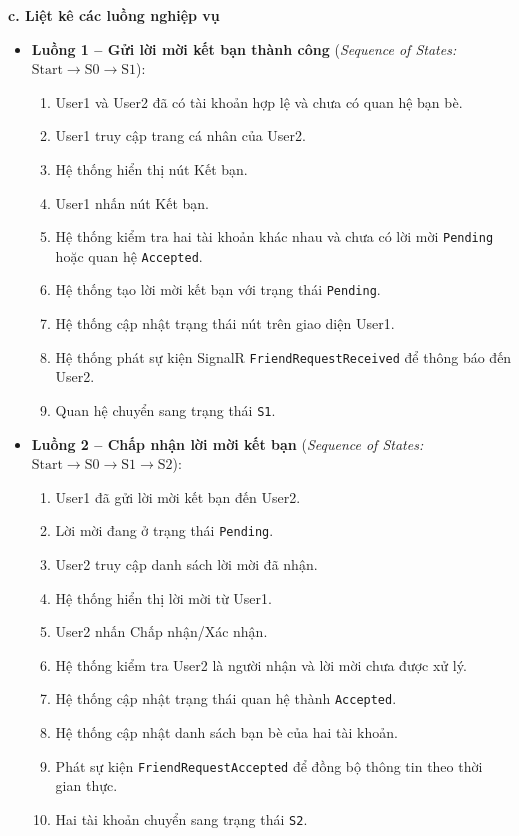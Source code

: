 \documentclass[11pt,a4paper]{article}
\begin{document}
\noindent\textbf{c. Liệt kê các luồng nghiệp vụ}
\begin{itemize}[leftmargin=1.2cm, noitemsep]
    \item[\textbf{--}] \textbf{Luồng 1 -- Gửi lời mời kết bạn thành công} (\textit{Sequence of States:} $\text{Start} \rightarrow \text{S0} \rightarrow \text{S1}$):
    \begin{enumerate}[leftmargin=0.7cm, noitemsep]
        \item User1 và User2 đã có tài khoản hợp lệ và chưa có quan hệ bạn bè.
        \item User1 truy cập trang cá nhân của User2.
        \item Hệ thống hiển thị nút Kết bạn.
        \item User1 nhấn nút Kết bạn.
        \item Hệ thống kiểm tra hai tài khoản khác nhau và chưa có lời mời \texttt{Pending} hoặc quan hệ \texttt{Accepted}.
        \item Hệ thống tạo lời mời kết bạn với trạng thái \texttt{Pending}.
        \item Hệ thống cập nhật trạng thái nút trên giao diện User1.
        \item Hệ thống phát sự kiện SignalR \texttt{FriendRequestReceived} để thông báo đến User2.
        \item Quan hệ chuyển sang trạng thái \texttt{S1}.
    \end{enumerate}

    \item[\textbf{--}] \textbf{Luồng 2 -- Chấp nhận lời mời kết bạn} (\textit{Sequence of States:} $\text{Start} \rightarrow \text{S0} \rightarrow \text{S1} \rightarrow \text{S2}$):
    \begin{enumerate}[leftmargin=0.7cm, noitemsep]
        \item User1 đã gửi lời mời kết bạn đến User2.
        \item Lời mời đang ở trạng thái \texttt{Pending}.
        \item User2 truy cập danh sách lời mời đã nhận.
        \item Hệ thống hiển thị lời mời từ User1.
        \item User2 nhấn Chấp nhận/Xác nhận.
        \item Hệ thống kiểm tra User2 là người nhận và lời mời chưa được xử lý.
        \item Hệ thống cập nhật trạng thái quan hệ thành \texttt{Accepted}.
        \item Hệ thống cập nhật danh sách bạn bè của hai tài khoản.
        \item Phát sự kiện \texttt{FriendRequestAccepted} để đồng bộ thông tin theo thời gian thực.
        \item Hai tài khoản chuyển sang trạng thái \texttt{S2}.
    \end{enumerate}


\end{itemize}
\end{document}
